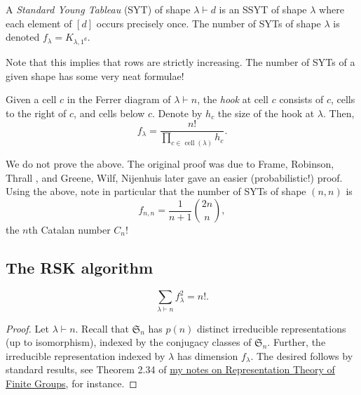 	\begin{fdef}
		A \emph{Standard Young Tableau} (SYT) of shape $\lambda\vdash d$ is an SSYT of shape $\lambda$ where each element of $[d]$ occurs precisely once. The number of SYTs of shape $\lambda$ is denoted $f_\lambda = K_{\lambda,1^d}$.
	\end{fdef}
	Note that this implies that rows are strictly increasing. The number of SYTs of a given shape has some very neat formulae!

	\begin{ftheo}
		Given a cell $c$ in the Ferrer diagram of $\lambda \vdash n$, the \emph{hook} at cell $c$ consists of $c$, cells to the right of $c$, and cells below $c$. Denote by $h_c$ the size of the hook at $\lambda$. Then,
		\[ f_\lambda = \frac{n!}{\prod_{c \in \operatorname{cell}(\lambda)} h_c}. \]
	\end{ftheo}
	We do not prove the above. The original proof was due to Frame, Robinson, Thrall \cite{frt-hook}, and Greene, Wilf, Nijenhuis \cite{grn-hook} later gave an easier (probabilistic!) proof.\\
	Using the above, note in particular that the number of SYTs of shape $(n,n)$ is
	\[ f_{n,n} = \frac{1}{n+1} \binom{2n}{n}, \]
	the $n$th Catalan number $C_n$!

\subsection{The RSK algorithm}

	\begin{ftheo}
		\[ \sum_{\lambda \vdash n} f_\lambda^2 = n!. \]
	\end{ftheo}
	\begin{proof}
		Let $\lambda \vdash n$. Recall that $\mathfrak{S}_n$ has $p(n)$ distinct irreducible representations (up to isomorphism), indexed by the conjugacy classes of $\mathfrak{S}_n$. Further, the irreducible representation indexed by $\lambda$ has dimension $f_\lambda$. The desired follows by standard results, see Theorem 2.34 of \href{https://amitrajaraman.github.io/notes/rep-th/main.pdf}{my notes on Representation Theory of Finite Groups}, for instance.
	\end{proof}


